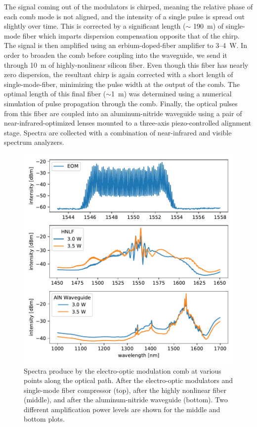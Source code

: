 The signal coming out of the modulators is chirped, meaning the relative phase of each comb mode is not aligned, and the intensity of a single pulse is spread out slightly over time. This is corrected by a significant length ($\sim$ 190~\si{\meter}) of single-mode fiber which imparts dispersion compensation opposite that of the chirp. The signal is then amplified using an erbium-doped-fiber amplifier to 3--4~\si{\watt}. In order to broaden the comb before coupling into the waveguide, we send it through 10~\si{\meter} of highly-nonlinear silicon fiber. Even though this fiber has nearly zero dispersion, the resultant chirp is again corrected with a short length of single-mode-fiber, minimizing the pulse width at the output of the comb. The optimal length of this final fiber ($\sim$1~\si{\meter}) was determined using a numerical simulation of pulse propagation through the comb. Finally, the optical pulses from this fiber are coupled into an aluminum-nitride waveguide using a pair of near-infrared-optimized lenses mounted to a three-axis piezo-controlled alignment stage. Spectra are collected with a combination of near-infrared and visible spectrum analyzers.

\begin{figure}
    \centering
    \includegraphics[width=\textwidth]{figures-3/eom-spectra.pdf}
    \caption[Electro-optic modulation comb spectra]{Spectra produce by the electro-optic modulation comb at various points along the optical path. After the electro-optic modulators and single-mode fiber compressor (top), after the highly nonlinear fiber (middle), and after the aluminum-nitride waveguide (bottom). Two different amplification power levels are shown for the middle and bottom plots.}
    \label{fig:eom-spectra}
\end{figure}

